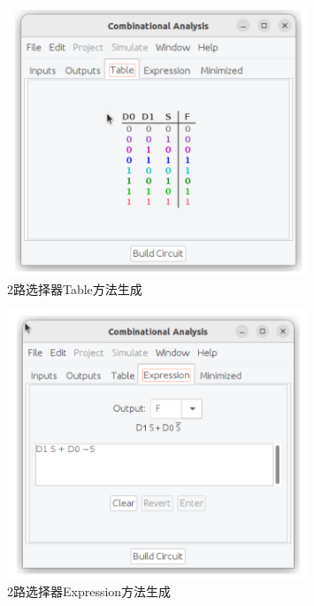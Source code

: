 \documentclass{article}
\begin{document}
    \begin{figure}[H]
    \centering
    \includegraphics[width=0.8\textwidth]{5.1.1.png}
    \caption{ 2路选择器Table方法生成}
    \end{figure}

    \begin{figure}[H]
    \centering
    \includegraphics[width=0.8\textwidth]{5.1.2.png}
    \caption{ 2路选择器Expression方法生成}
    \end{figure}
\end{document}
